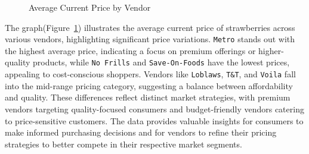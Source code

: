 \documentclass[
  letterpaper,
  DIV=11,
  numbers=noendperiod]{scrartcl}
\begin{document}
\begin{figure}


\caption{\label{fig-currentpricebyvendor}Average Current Price by
Vendor}

\end{figure}%

The graph(Figure~\ref{fig-currentpricebyvendor}) illustrates the average
current price of strawberries across various vendors, highlighting
significant price variations. \texttt{Metro} stands out with the highest
average price, indicating a focus on premium offerings or higher-quality
products, while \texttt{No\ Frills} and \texttt{Save-On-Foods} have the
lowest prices, appealing to cost-conscious shoppers. Vendors like
\texttt{Loblaws}, \texttt{T\&T}, and \texttt{Voila} fall into the
mid-range pricing category, suggesting a balance between affordability
and quality. These differences reflect distinct market strategies, with
premium vendors targeting quality-focused consumers and budget-friendly
vendors catering to price-sensitive customers. The data provides
valuable insights for consumers to make informed purchasing decisions
and for vendors to refine their pricing strategies to better compete in
their respective market segments.
\end{document}
